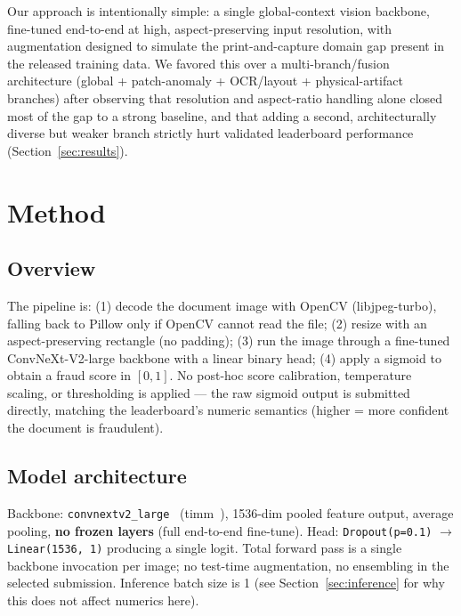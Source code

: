 \documentclass[11pt,a4paper]{article}
\begin{document}
Our approach is intentionally simple: a single global-context vision
backbone, fine-tuned end-to-end at high, aspect-preserving input resolution,
with augmentation designed to simulate the print-and-capture domain gap
present in the released training data. We favored this over a
multi-branch/fusion architecture (global + patch-anomaly + OCR/layout +
physical-artifact branches) after observing that resolution and aspect-ratio
handling alone closed most of the gap to a strong baseline, and that adding a
second, architecturally diverse but weaker branch strictly hurt validated
leaderboard performance (Section~\ref{sec:results}).

\section{Method}
\label{sec:method}

\subsection{Overview}
The pipeline is: (1) decode the document image with OpenCV
(libjpeg-turbo), falling back to Pillow only if OpenCV cannot read the file;
(2) resize with an aspect-preserving rectangle (no padding); (3) run the
image through a fine-tuned ConvNeXt-V2-large backbone with a linear binary
head; (4) apply a sigmoid to obtain a fraud score in $[0,1]$. No
post-hoc score calibration, temperature scaling, or thresholding is applied —
the raw sigmoid output is submitted directly, matching the leaderboard's
numeric semantics (higher = more confident the document is fraudulent).

\subsection{Model architecture}
Backbone: \texttt{convnextv2\_large}~\cite{convnextv2} (timm~\cite{timm}), 1536-dim pooled
feature output, average pooling, \textbf{no frozen layers} (full end-to-end
fine-tune). Head: \texttt{Dropout(p=0.1)} $\rightarrow$ \texttt{Linear(1536,
1)} producing a single logit. Total forward pass is a single backbone
invocation per image; no test-time augmentation, no ensembling in the
selected submission. Inference batch size is 1 (see
Section~\ref{sec:inference} for why this does not affect numerics here).
\end{document}
